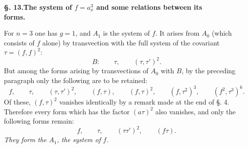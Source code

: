 \documentclass[10pt]{article}
\begin{document}
\begin{center}
{\bfseries §. 13.\quad The system of $f=a_x^3$ and some relations between its\\forms.}
\end{center}

For $n=3$ one has $g=1$, and $A_1$ is the system of $f$. It arises from $A_0$ (which consists of $f$ alone) by transvection with the full system of the covariant $\tau=(f,f)^2$:
\[
B:
\qquad \tau,
\qquad (\tau,\tau')^2.
\]
But among the forms arising by transvections of $A_0$ with $B$, by the preceding paragraph only the following are to be retained:
\[
f,
\qquad \tau,
\qquad (\tau,\tau')^2,
\qquad (f,\tau),
\qquad (f,\tau)^2,
\qquad (f,\tau^2)^3,
\qquad (f^2,\tau^3)^6.
\]
Of these, $(f,\tau)^2$ vanishes identically by a remark made at the end of §. 4. Therefore every form which has the factor $(a\tau)^2$ also vanishes, and only the following forms remain:
\[
f,
\qquad \tau,
\qquad (\tau\tau')^2,
\qquad (f\tau).
\]
\textit{They form the $A_1$, the system of $f$.}
\end{document}
